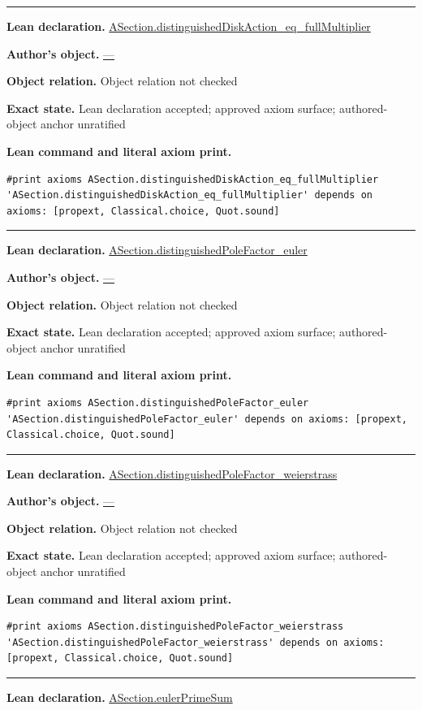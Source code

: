 \documentclass[11pt]{article}
\theoremstyle{plain}
\theoremstyle{definition}
\theoremstyle{remark}
\begin{document}
\begin{tcolorbox}
\medskip\hrule\medskip
\textbf{Lean declaration.} \url{ASection.distinguishedDiskAction_eq_fullMultiplier}
\par\textbf{Author's object.} \url{—}
\par\textbf{Object relation.} Object relation not checked
\par\textbf{Exact state.} Lean declaration accepted; approved axiom surface; authored-object anchor unratified
\par\smallskip\textbf{Lean command and literal axiom print.}
\begin{Verbatim}[breaklines=true,breakanywhere=true,fontsize=\small]
#print axioms ASection.distinguishedDiskAction_eq_fullMultiplier
'ASection.distinguishedDiskAction_eq_fullMultiplier' depends on axioms: [propext, Classical.choice, Quot.sound]
\end{Verbatim}
\medskip\hrule\medskip
\textbf{Lean declaration.} \url{ASection.distinguishedPoleFactor_euler}
\par\textbf{Author's object.} \url{—}
\par\textbf{Object relation.} Object relation not checked
\par\textbf{Exact state.} Lean declaration accepted; approved axiom surface; authored-object anchor unratified
\par\smallskip\textbf{Lean command and literal axiom print.}
\begin{Verbatim}[breaklines=true,breakanywhere=true,fontsize=\small]
#print axioms ASection.distinguishedPoleFactor_euler
'ASection.distinguishedPoleFactor_euler' depends on axioms: [propext, Classical.choice, Quot.sound]
\end{Verbatim}
\medskip\hrule\medskip
\textbf{Lean declaration.} \url{ASection.distinguishedPoleFactor_weierstrass}
\par\textbf{Author's object.} \url{—}
\par\textbf{Object relation.} Object relation not checked
\par\textbf{Exact state.} Lean declaration accepted; approved axiom surface; authored-object anchor unratified
\par\smallskip\textbf{Lean command and literal axiom print.}
\begin{Verbatim}[breaklines=true,breakanywhere=true,fontsize=\small]
#print axioms ASection.distinguishedPoleFactor_weierstrass
'ASection.distinguishedPoleFactor_weierstrass' depends on axioms: [propext, Classical.choice, Quot.sound]
\end{Verbatim}
\medskip\hrule\medskip
\textbf{Lean declaration.} \url{ASection.eulerPrimeSum}

\end{tcolorbox}
\end{document}
